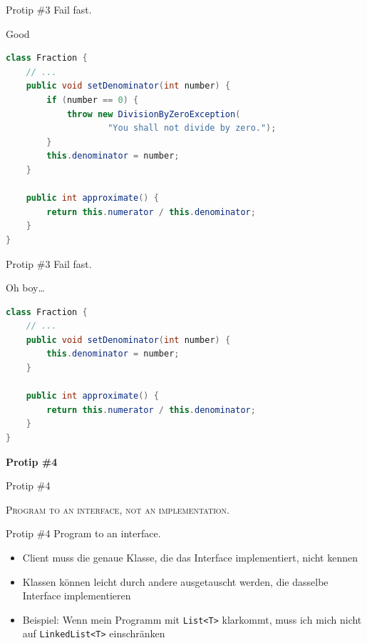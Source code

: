 \documentclass[18pt]{beamer}
\begin{document}
\begin{frame}[fragile]{Protip \#3 Fail fast.}
    \begin{exampleblock}{Good}
        \begin{lstlisting}[language=Java,basicstyle=\scriptsize]
class Fraction {
    // ...
    public void setDenominator(int number) {
        if (number == 0) {
            throw new DivisionByZeroException(
                    "You shall not divide by zero.");
        }
        this.denominator = number;
    }

    public int approximate() {
        return this.numerator / this.denominator;
    }
}
        \end{lstlisting}
    \end{exampleblock}
\end{frame}

\begin{frame}[fragile]{Protip \#3 Fail fast.}
    \begin{alertblock}{Oh boy\dots}
        \begin{lstlisting}[language=Java,basicstyle=\scriptsize]
class Fraction {
    // ...
    public void setDenominator(int number) {
        this.denominator = number;
    }

    public int approximate() {
        return this.numerator / this.denominator;
    }
}
        \end{lstlisting}
    \end{alertblock}
\end{frame}

\begin{frame}{\quad}
    \center
    \Huge{\textbf{Protip \#4}}
\end{frame}

\begin{frame}{Protip \#4}
    \begin{block}{}
        \center
        \textsc{Program to an interface, not an implementation.}
    \end{block}
\end{frame}

\begin{frame}{Protip \#4 Program to an interface.}
    \begin{itemize}
        \item Client muss die genaue Klasse, die das Interface implementiert, nicht kennen
        \item Klassen können leicht durch andere ausgetauscht werden, die dasselbe Interface implementieren
        \vspace{.2in}
        \item Beispiel: Wenn mein Programm mit \texttt{List<T>} klarkommt, muss ich mich nicht auf \texttt{LinkedList<T>} einschränken
    \end{itemize}
\end{frame}
\end{document}

